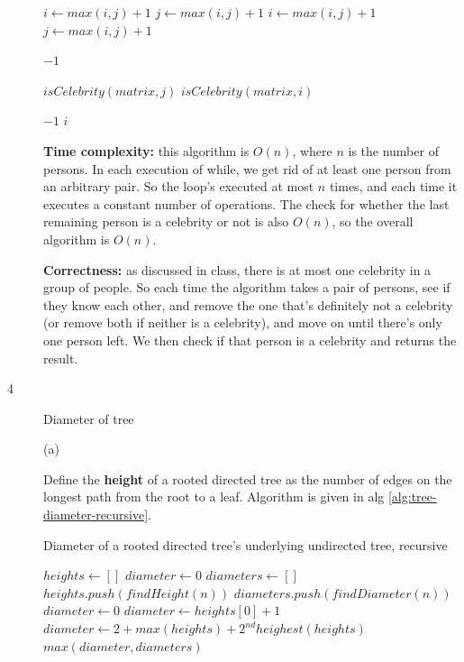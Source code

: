 \documentclass{article}
\begin{document}
\begin{description}
\begin{algorithm}[h]
\begin{algorithmic}[1]
          \State $i \gets max(i,j) + 1$
          \State $j \gets max(i,j) + 1$
        \Else
          \State $i \gets max(i,j) + 1$
          \State $j \gets max(i,j) + 1$
        \EndIf
      \EndWhile

        \State \Return $-1$
      \EndIf

        \State \Return $isCelebrity(matrix, j)$
      \Else
        \State \Return $isCelebrity(matrix, i)$
      \EndIf
    \EndFunction

          \State \Return $-1$
        \EndIf
      \EndFor
      \State \Return $i$
    \EndFunction
    \end{algorithmic}
  \end{algorithm}

  \textbf{Time complexity:} this algorithm is $O(n)$, where $n$ is the number of persons. In each execution of while, we get rid of at least one person from an arbitrary pair. So the loop's executed at most $n$ times, and each time it executes a constant number of operations. The check for whether the last remaining person is a celebrity or not is also $O(n)$, so the overall algorithm is $O(n)$.

  \textbf{Correctness:} as discussed in class, there is at most one celebrity in a group of people. So each time the algorithm takes a pair of persons, see if they know each other, and remove the one that's definitely not a celebrity (or remove both if neither is a celebrity), and move on until there's only one person left. We then check if that person is a celebrity and returns the result.

\item[4]{Diameter of tree}
  
  (a)

  Define the \textbf{height} of a rooted directed tree as the number of edges on the longest path from the root to a leaf. Algorithm is given in alg \ref{alg:tree-diameter-recursive}.

  \begin{algorithm}[h]
  \caption{Diameter of a rooted directed tree's underlying undirected tree, recursive}
  \label{alg:tree-diameter-recursive}
    \begin{algorithmic}[1]
      \State $heights \gets []$
      \State $diameter \gets 0$
      \State $diameters \gets []$
        \State $heights.push(findHeight(n))$
        \State $diameters.push(findDiameter(n))$
      \EndFor
        \State $diameter \gets 0$
        \State $diameter \gets heights[0] + 1$
      \Else
        \State $diameter \gets 2 + max(heights) + 2^{nd}heighest(heights)$
      \EndIf
      \State \Return $max(diameter, diameters)$
    \EndFunction


\end{algorithmic}
\end{algorithm}
\end{description}
\end{document}
